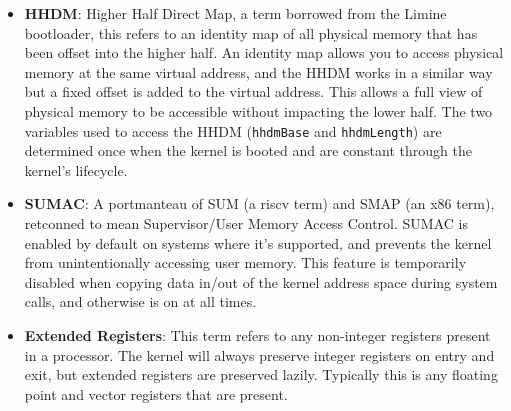 \begin{itemize}
    \item \textbf{HHDM}: Higher Half Direct Map, a term borrowed from the Limine bootloader, this refers to an identity map of all physical memory that has been offset into the higher half. An identity map allows you to access physical memory at the same virtual address, and the HHDM works in a similar way but a fixed offset is added to the virtual address. This allows a full view of physical memory to be accessible without impacting the lower half. The two variables used to access the HHDM (\verb|hhdmBase| and \verb|hhdmLength|) are determined once when the kernel is booted and are constant through the kernel's lifecycle.
    \item \textbf{SUMAC}: A portmanteau of SUM (a riscv term) and SMAP (an x86 term), retconned to mean Supervisor/User Memory Access Control. SUMAC is enabled by default on systems where it's supported, and prevents the kernel from unintentionally accessing user memory. This feature is temporarily disabled when copying data in/out of the kernel address space during system calls, and otherwise is on at all times.
    \item \textbf{Extended Registers}: This term refers to any non-integer registers present in a processor. The kernel will always preserve integer registers on entry and exit, but extended registers are preserved lazily. Typically this is any floating point and vector registers that are present.
\end{itemize}
